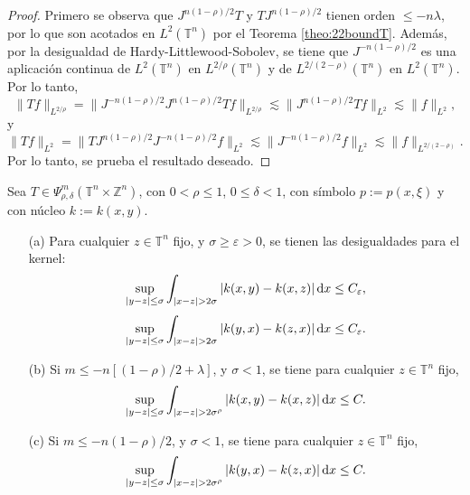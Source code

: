 \begin{proof}
	Primero se observa que $J^{n(1-\rho)/2}T$ y $TJ^{n(1-\rho)/2}$ tienen orden $\leq -n\lambda$, por lo que son acotados en $L^2(\mathbb{T}^n)$ por el Teorema \ref{theo:22boundT}. Además, por la desigualdad de Hardy-Littlewood-Sobolev, se tiene que $J^{-n(1-\rho)/2}$ es una aplicación continua de $L^2(\mathbb{T}^n)$ en $L^{2/\rho}(\mathbb{T}^n)$ y de $L^{2/(2-\rho)}(\mathbb{T}^n)$ en $L^2(\mathbb{T}^n)$. Por lo tanto, 
	\begin{equation*}
		\| Tf \|_{L^{2/\rho}} = \| J^{-n(1-\rho)/2}J^{n(1-\rho)/2}Tf\|_{L^{2/\rho}} \lesssim \| J^{n(1-\rho)/2}Tf \|_{L^2} \lesssim \| f \|_{L^2},
	\end{equation*}
	y 
	\begin{equation*}
		\| Tf \|_{L^2} = \| TJ^{n(1-\rho)/2}J^{-n(1-\rho)/2}f\|_{L^2} \lesssim \| J^{-n(1-\rho)/2}f \|_{L^2} \lesssim \|f\|_{L^{2/(2-\rho)}}.
	\end{equation*}
	Por lo tanto, se prueba el resultado deseado.
\end{proof}
\begin{theorem}	\label{theo:kernel-estimate-sigma}
	Sea $T \in \Psi^m_{\rho, \delta}(\mathbb{T}^n \times \mathbb{Z}^n) $, con $0 < \rho \leq 1$, $0 \leq \delta < 1$, con símbolo $p:=p(x, \xi)$ y con núcleo $k:=k(x, y)$. 
	\begin{itemize}
		\item[(a)] Para cualquier $z \in \mathbb{T}^n$ fijo, y $\sigma \geq \varepsilon > 0$, se tienen las desigualdades para el kernel:
		\begin{equation}
			\sup_{|y-z| \leq \sigma} \int_{|x-z| > 2\sigma}|k(x, y) - k(x, z)|\mathop{}\!\mathrm{d} x \leq C_\varepsilon,
		\end{equation}
		\begin{equation}
			\sup_{|y-z| \leq \sigma} \int_{|x-z| > 2\sigma}|k(y, x) - k(z, x)|\mathop{}\!\mathrm{d} x \leq C_\varepsilon.
		\end{equation}
		\item[(b)] Si $m \leq -n [(1-\rho)/2 + \lambda] $, y $\sigma < 1$, se tiene para cualquier $z \in \mathbb{T}^n$ fijo, 
		\begin{equation}
			\sup_{|y-z| \leq \sigma} \int_{|x-z| > 2\sigma^\rho}|k(x, y) - k(x, z)|\mathop{}\!\mathrm{d} x \leq C.
		\end{equation}
		\item[(c)] Si $m \leq -n (1 - \rho) / 2$, y $\sigma < 1$, se tiene para cualquier $z \in \mathbb{T}^n$ fijo,
		\begin{equation}
			\sup_{|y-z| \leq \sigma} \int_{|x-z| > 2\sigma^\rho}|k(y, x) - k(z, x)|\mathop{}\!\mathrm{d} x \leq C.
		\end{equation} 
	\end{itemize}
\end{theorem}
